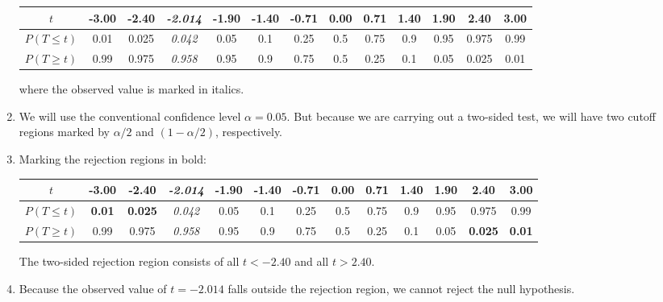 \begin{enumerate}
  \begin{center}
    \begin{tabular}{c|c@{\gap}c@{\gap}c@{\gap}c@{\gap}
        c@{\gap}c@{\gap}c@{\gap}c@{\gap}c@{\gap}c@{\gap}c@{\gap}c}
      $t$ & -3.00 & -2.40 & \textit{-2.014} & -1.90 & -1.40 & -0.71 &
      0.00 & 0.71 & 1.40 & 1.90 & 2.40 & 3.00 \\ \hline
      $P(T\leq{t})$ & 0.01 & 0.025 & \textit{0.042} & 0.05 & 0.1 & 0.25 &
      0.5 & 0.75 & 0.9 & 0.95 & 0.975 & 0.99 \\
      $P(T\geq{t})$ & 0.99 & 0.975 & \textit{0.958} & 0.95 & 0.9 & 0.75 & 0.5 &
      0.25 & 0.1 & 0.05 & 0.025 & 0.01
    \end{tabular}
  \end{center}

  \noindent where the observed value is marked in italics.
  
\item We will use the conventional confidence level $\alpha =
  0.05$. But because we are carrying out a two-sided test, we will
  have two cutoff regions marked by $\alpha/2$ and $(1-\alpha/2)$,
  respectively.

\item Marking the rejection regions in bold:
  
  \begin{center}
    \begin{tabular}{c|c@{\gap}c@{\gap}c@{\gap}c@{\gap}
        c@{\gap}c@{\gap}c@{\gap}c@{\gap}c@{\gap}c@{\gap}c@{\gap}c}
      $t$ & \textbf{-3.00} & \textbf{-2.40} & \emph{-2.014} &
      -1.90 & -1.40 & -0.71 & 0.00 & 0.71 & 1.40 & 1.90 &
      \textbf{2.40} & \textbf{3.00} \\ \hline
      $P(T\leq{t})$ & \textbf{0.01} & \textbf{0.025} &
      \textit{0.042} & 0.05 & 0.1 & 0.25 &
      0.5 & 0.75 & 0.9 & 0.95 & 0.975 & 0.99 \\
      $P(T\geq{t})$ & 0.99 & 0.975 & \textit{0.958} & 0.95 & 0.9 & 0.75 & 0.5 &
      0.25 & 0.1 & 0.05 & \textbf{0.025} & \textbf{0.01}
    \end{tabular}
  \end{center}

  The two-sided rejection region consists of all $t<-2.40$ and all
  $t>{2.40}$.

\item Because the observed value of $t=-2.014$ falls outside the
  rejection region, we cannot reject the null hypothesis.

\end{enumerate}

